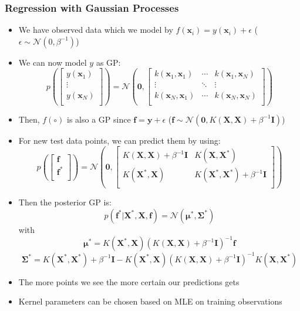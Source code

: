 \subsubsection{Regression with Gaussian Processes}
\begin{itemize}
	\item We have observed data which we model by $f(\bm{x}_i) = y(\bm{x}_i) + \epsilon$ ($\epsilon\sim\mathcal{N}(0,\beta^{-1})$)
	\item We can now model $y$ as GP: 
	$$p\left(\begin{bmatrix}
	y(\bm{x}_1)\\
	\vdots\\
	y(\bm{x}_N)\\
	\end{bmatrix}\right) = \mathcal{N}\left(\bm{0}, \begin{bmatrix}
	k(\bm{x}_1, \bm{x}_1) & \cdots & k(\bm{x}_1, \bm{x}_N)\\
	\vdots & \ddots & \vdots\\
	k(\bm{x}_N, \bm{x}_1)& \cdots & k(\bm{x}_N, \bm{x}_N)\\
	\end{bmatrix}\right)$$
	\item Then, $f(\circ)$ is also a GP since $\bm{f} = \bm{y} + \epsilon$ ($\bm{f}\sim \mathcal{N}(\bm{0}, K(\bm{X}, \bm{X}) + \beta^{-1}\bm{I})$)
	\item For new test data points, we can predict them by using:
	$$p\left(\begin{bmatrix}
	\bm{f}\\
	\bm{f}^{*}\\
	\end{bmatrix}\right) = \mathcal{N}\left(\bm{0}, \begin{bmatrix}
	K(\bm{X}, \bm{X}) + \beta^{-1}\bm{I} & K(\bm{X},\bm{X}^{*})\\
	K(\bm{X}^{*},\bm{X}) & K(\bm{X}^{*}, \bm{X}^{*}) + \beta^{-1}\bm{I}\\
	\end{bmatrix}\right)$$
	\item Then the posterior GP is: $$ p(\bm{f}^* | \bm{X}^*, \bm{X}, \bm{f}) = \mathcal{N}(\bm{\mu}^*, \bm{\Sigma}^*) $$ with $$\bm{\mu}^* = K(\bm{X}^*,\bm{X})(K(\bm{X},\bm{X}) + \beta^{-1} \bm{I})^{-1} \bm{f}$$ $$\bm{\Sigma}^* = K(\bm{X}^*,\bm{X}^*) + \beta^{-1} \bm{I} - K(\bm{X}^*,\bm{X}) (K(\bm{X},\bm{X}) + \beta^{-1} \bm{I})^{-1} K(\bm{X},\bm{X}^*)$$
	\item The more points we see the more certain our predictions gets
	\item Kernel parameters can be chosen based on MLE on training observations
\end{itemize}